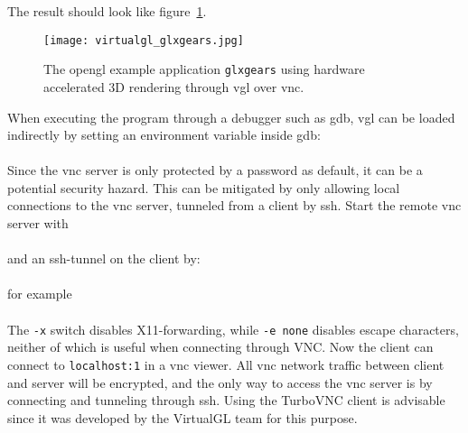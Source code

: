 The result should look like figure~\ref{fig:virtualgl_glxgears}.
\begin{figure}[ht]
\begin{center}
\texttt{[image: virtualgl\_glxgears.jpg]}
\end{center}
\caption{The \gls{opengl} example application \texttt{glxgears} using hardware accelerated 3D rendering through \gls{vgl} over \gls{vnc}.}
\label{fig:virtualgl_glxgears}
\end{figure}
When executing the program through a debugger such as \gls{gdb}, \gls{vgl} can be loaded indirectly by setting an environment variable inside \gls{gdb}:\\[\baselineskip]
\\[\baselineskip]
Since the \gls{vnc} server is only protected by a password as default, it can be a potential security hazard. This can be mitigated by only allowing local connections to the \gls{vnc} server, tunneled from a client by \gls{ssh}. Start the remote \gls{vnc} server with\\[\baselineskip]
\\[\baselineskip]
and an \gls{ssh}-tunnel on the client by:\\[\baselineskip]
\\[\baselineskip]
for example \\[\baselineskip]
\\[\baselineskip]
The \texttt{-x} switch disables X11-forwarding, while \texttt{-e none} disables escape characters, neither of which is useful when connecting through VNC. Now the client can connect to \texttt{localhost:1} in a \gls{vnc} viewer. All \gls{vnc} network traffic between client and server will be encrypted, and the only way to access the \gls{vnc} server is by connecting and tunneling through \gls{ssh}. Using the TurboVNC client is advisable since it was developed by the VirtualGL team for this purpose.

